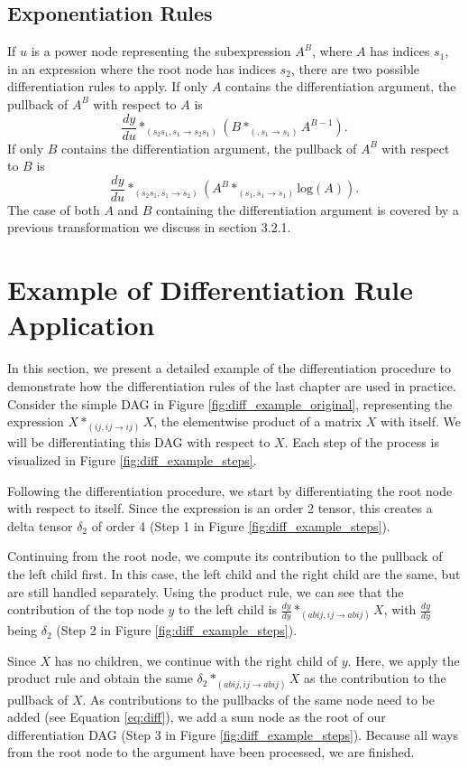 \documentclass[12pt, a4paper]{report}
\begin{document}
\subsection{Exponentiation Rules}
If $u$ is a power node representing the subexpression $A^B$, where $A$ has indices $s_1$, in an expression where the root node has indices $s_2$, there are two possible differentiation rules to apply.
If only $A$ contains the differentiation argument, the pullback of $A^B$ with respect to $A$ is 
$$
\frac{dy}{du} *_{(s_2 s_1, s_1 \rightarrow s_2 s_1)} (B *_{(, s_1 \rightarrow s_1)} A^{B-1}).
$$
If only $B$ contains the differentiation argument, the pullback of $A^B$ with respect to $B$ is
$$
\frac{dy}{du} *_{(s_2 s_1, s_1 \rightarrow s_2)} (A^B *_{(s_1, s_1 \rightarrow s_1)} \text{log}(A)).
$$
The case of both $A$ and $B$ containing the differentiation argument is covered by a previous transformation we discuss in section 3.2.1.


\FloatBarrier
\section{Example of Differentiation Rule Application}
In this section, we present a detailed example of the differentiation procedure to demonstrate how the differentiation rules of the last chapter are used in practice.
Consider the simple DAG in Figure \ref{fig:diff_example_original}, representing the expression $X *_{(ij,ij \rightarrow ij)} X$, the elementwise product of a matrix $X$ with itself.
We will be differentiating this DAG with respect to $X$.
Each step of the process is visualized in Figure \ref{fig:diff_example_steps}.

Following the differentiation procedure, we start by differentiating the root node with respect to itself.
Since the expression is an order 2 tensor, this creates a delta tensor $\delta_2$ of order 4 (Step 1 in Figure \ref{fig:diff_example_steps}).

Continuing from the root node, we compute its contribution to the pullback of the left child first.
In this case, the left child and the right child are the same, but are still handled separately.
Using the product rule, we can see that the contribution of the top node $y$ to the left child is $\frac{dy}{dy} *_{(abij,ij \rightarrow abij)} X$, with $\frac{dy}{dy}$ being $\delta_2$ (Step 2 in Figure \ref{fig:diff_example_steps}).

Since $X$ has no children, we continue with the right child of $y$.
Here, we apply the product rule and obtain the same $\delta_2 *_{(abij,ij \rightarrow abij)} X$ as the contribution to the pullback of $X$.
As contributions to the pullbacks of the same node need to be added (see Equation \ref{eq:diff}), we add a sum node as the root of our differentiation DAG (Step 3 in Figure \ref{fig:diff_example_steps}).
Because all ways from the root node to the argument have been processed, we are finished.
\end{document}
